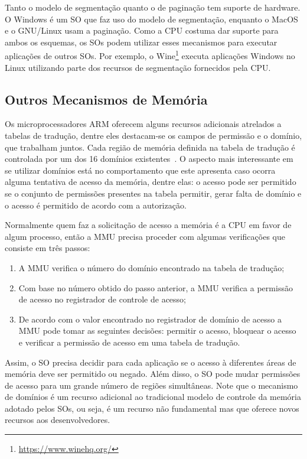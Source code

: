 Tanto o modelo de segmentação quanto o de paginação tem suporte de hardware. O
Windows é um SO que faz uso do modelo de segmentação, enquanto o MacOS e o
GNU/Linux usam a paginação. Como a CPU costuma dar suporte para ambos os
esquemas, os SOs podem utilizar esses mecanismos para executar aplicações de
outros SOs. Por exemplo, o Wine\footnote{\url{https://www.winehq.org/}} executa
aplicações Windows no Linux utilizando parte dos recursos de segmentação
fornecidos pela CPU.

\subsection{Outros Mecanismos de Memória}
\label{sec:outros_mecanismos_memoria}

Os microprocessadores ARM oferecem alguns recursos adicionais atrelados a
tabelas de tradução, dentre eles destacam-se os campos de permissão e o
domínio, que trabalham juntos. Cada região de memória definida na tabela de
tradução é controlada por um dos 16 domínios
existentes~\citep{armdeveloperguide}.  O aspecto mais interessante em se
utilizar domínios está no comportamento que este apresenta caso ocorra alguma
tentativa de acesso da memória, dentre elas: o acesso pode ser permitido se o
conjunto de permissões presentes na tabela permitir, gerar falta de domínio e o
acesso é permitido de acordo com a autorização.

Normalmente quem faz a solicitação de acesso a memória é a CPU em favor de
algum processo, então a MMU precisa proceder com algumas verificações que
consiste em três passos:

\begin{enumerate}
  \item A MMU verifica o número do domínio encontrado na tabela de tradução;
  \item Com base no número obtido do passo anterior, a MMU verifica a permissão
        de acesso no registrador de controle de acesso;
  \item De acordo com o valor encontrado no registrador de domínio de acesso a
        MMU pode tomar as seguintes decisões: permitir o acesso, bloquear o
				acesso e verificar a permissão de acesso em uma tabela de tradução.
\end{enumerate}

Assim, o SO precisa decidir para cada aplicação se o acesso à diferentes áreas
de memória deve ser permitido ou negado.  Além disso, o SO pode mudar
permissões de acesso para um grande número de regiões simultâneas. Note que o
mecanismo de domínios é um recurso adicional ao tradicional modelo de controle
da memória adotado pelos SOs, ou seja, é um recurso não fundamental mas que
oferece novos recursos aos desenvolvedores.


